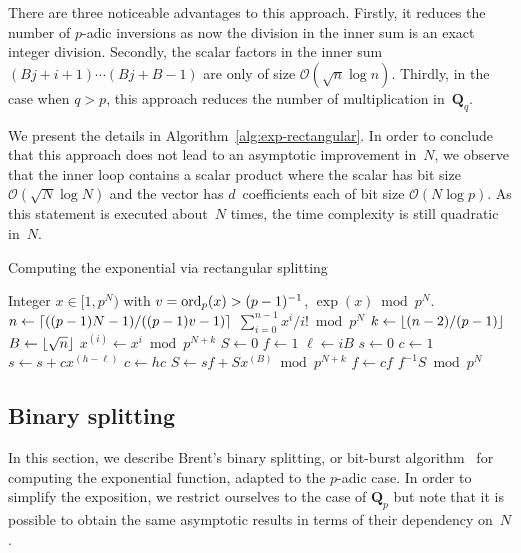 There are three noticeable advantages to this approach.  Firstly, it 
reduces the number of $p$-adic inversions as now the division in the 
inner sum is an exact integer division.  Secondly, the scalar factors 
in the inner sum $(B j + i + 1) \dotsm (B j + B - 1)$ are only of size 
$\mathcal{O}(\sqrt{n} \log n)$.  Thirdly, in the case when $q > p$, 
this approach reduces the number of multiplication in~$\mathbf{Q}_q$.

We present the details in Algorithm~\ref{alg:exp-rectangular}.  In order 
to conclude that this approach does not lead to an asymptotic improvement 
in~$N$, we observe that the inner loop contains a scalar product where the 
scalar has bit size $\mathcal{O}(\sqrt{N} \log N)$ and the 
vector has $d$~coefficients each of bit size $\mathcal{O}(N \log p)$.  
As this statement is executed about~$N$ times, the time complexity is still 
quadratic in~$N$.

\begin{algorithm}
\caption{Computing the exponential via rectangular splitting}
\label{alg:exp-rectangular}
\begin{algorithmic}
\vspace{1mm}
\Require Integer $x \in [1,p^N)$ with $v = \operatorname{ord}_p(x) > (p-1)^{-1}$,
\Ensure  $\exp(x) \bmod{p^N}$.
\State $n \gets \left\lceil((p-1)N - 1) / ((p-1)v - 1)\right\rceil$
\Return $\sum_{i=0}^{n-1} x^i / i! \bmod{p^N}$
\Else
\State $k \gets \left\lfloor(n-2)/(p-1)\right\rfloor$
\State $B \gets \left\lfloor\sqrt{n}\right\rfloor$
\State $x^{(i)} \gets x^i \bmod {p^{N + k}}$
\EndFor
\State $S \gets 0$
\State $f \gets 1$
\State $\ell \gets i B$
\State $s \gets 0$
\State $c \gets 1$
\State $s \gets s + c x^{(h-\ell)}$
\State $c \gets h c$
\EndIf
\EndFor
\State $S \gets s f + S x^{(B)} \bmod{p^{N + k}}$
\State $f \gets c f$
\EndFor
\Return $f^{-1} S \bmod {p^N}$
\EndIf
\EndProcedure
\end{algorithmic}
\end{algorithm}

\subsection{Binary splitting}

In this section, we describe Brent's binary splitting, or bit-burst 
algorithm~\citep{Brent1976} for computing the exponential function, 
adapted to the $p$-adic case.  In order to simplify the exposition, 
we restrict ourselves to the case of $\mathbf{Q}_p$ but note that 
it is possible to obtain the same asymptotic results in terms of 
their dependency on~$N$.

